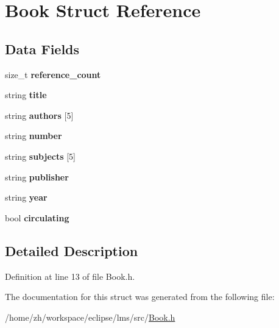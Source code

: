 \hypertarget{structBook}{\section{Book Struct Reference}
\label{structBook}
}
\subsection*{Data Fields}
\begin{DoxyCompactItemize}
\item 
\hypertarget{structBook_ab7befd3dbd3056a286a12e9fad0960d6}{size\-\_\-t {\bfseries reference\-\_\-count}}\label{structBook_ab7befd3dbd3056a286a12e9fad0960d6}

\item 
\hypertarget{structBook_a694d90d6902d5f9d280db89ba533fad6}{string {\bfseries title}}\label{structBook_a694d90d6902d5f9d280db89ba533fad6}

\item 
\hypertarget{structBook_ac25dffd3f575b6728c8343f10070c15a}{string {\bfseries authors} \mbox{[}5\mbox{]}}\label{structBook_ac25dffd3f575b6728c8343f10070c15a}

\item 
\hypertarget{structBook_a899feb6f765dc4a3c0c7ca4c326dd638}{string {\bfseries number}}\label{structBook_a899feb6f765dc4a3c0c7ca4c326dd638}

\item 
\hypertarget{structBook_abef6c666eba874862bb58f3cd5571468}{string {\bfseries subjects} \mbox{[}5\mbox{]}}\label{structBook_abef6c666eba874862bb58f3cd5571468}

\item 
\hypertarget{structBook_a37d70ef37aa29de0b9054fddb973dcf6}{string {\bfseries publisher}}\label{structBook_a37d70ef37aa29de0b9054fddb973dcf6}

\item 
\hypertarget{structBook_ae42607ff53a0dfeb8accd21434b14fd7}{string {\bfseries year}}\label{structBook_ae42607ff53a0dfeb8accd21434b14fd7}

\item 
\hypertarget{structBook_ada6b9821f0dffa514a0ab036c04b548f}{bool {\bfseries circulating}}\label{structBook_ada6b9821f0dffa514a0ab036c04b548f}

\end{DoxyCompactItemize}


\subsection{Detailed Description}


Definition at line 13 of file Book.\-h.



The documentation for this struct was generated from the following file\-:\begin{DoxyCompactItemize}
\item 
/home/zh/workspace/eclipse/lms/src/\hyperlink{Book_8h}{Book.\-h}\end{DoxyCompactItemize}
